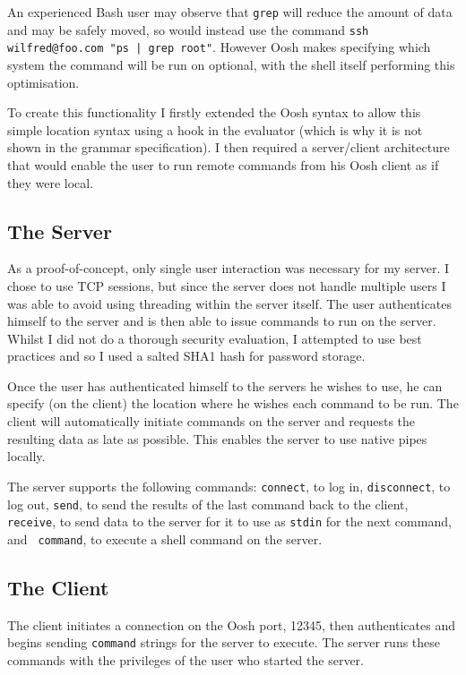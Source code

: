 \documentclass[12pt,twoside,notitlepage]{report}
\begin{document}
An experienced Bash user may observe that {\tt grep} will reduce the
amount of data and may be safely moved, so would instead use the
command {\tt ssh wilfred@foo.com "ps | grep root"}. However Oosh makes
specifying which system the command will be run on optional, with the
shell itself performing this optimisation.

To create this functionality I firstly extended the Oosh syntax to
allow this simple location syntax using a hook in the evaluator (which
is why it is not shown in the grammar specification). I then required
a server/client architecture that would enable the user to run remote
commands from his Oosh client as if they were local.

\subsection{The Server}
As a proof-of-concept, only single user interaction was necessary for
my server. I chose to use TCP sessions, but since the server does not handle
multiple users I was able to avoid using threading within the server
itself. The user authenticates himself to the server and is then able
to issue commands to run on the server. Whilst I did not do a thorough
security evaluation, I attempted to use best practices and so I used a
salted SHA1 hash for password storage.

Once the user has authenticated himself to the servers he wishes to
use, he can specify (on the client) the location where he wishes each
command to be run. The client will automatically initiate commands on the
server and requests the resulting data as late as possible. This
enables the server to use native pipes locally.

The server supports the following commands: {\tt connect}, to log in,
{\tt disconnect}, to log out, {\tt send}, to send the results of the
last command back to the client, {\tt receive}, to send data to the
server for it to use as {\tt stdin} for the next command, and {\tt
  command}, to execute a shell command on the server.

\subsection{The Client}
The client initiates a connection on the Oosh port, 12345, then
authenticates and begins sending {\tt command} strings for the server
to execute. The server runs these commands with the privileges of the
user who started the server.
\end{document}
